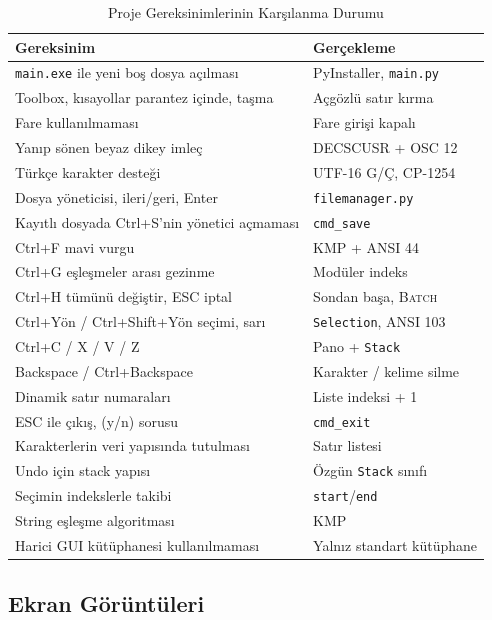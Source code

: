 \documentclass[conference,a4paper]{IEEEtran}
\newcommand{\kod}[1]{\texttt{#1}}
\begin{document}
\begin{table}[t]
\centering
\caption{Proje Gereksinimlerinin Karşılanma Durumu}
\label{tab:gereksinim}
\begin{tabular}{@{}p{4.9cm}p{2.6cm}@{}}
\toprule
\textbf{Gereksinim} & \textbf{Gerçekleme} \\
\midrule
\kod{main.exe} ile yeni boş dosya açılması & PyInstaller, \kod{main.py} \\
Toolbox, kısayollar parantez içinde, taşma & Açgözlü satır kırma \\
Fare kullanılmaması & Fare girişi kapalı \\
Yanıp sönen beyaz dikey imleç & DECSCUSR + OSC 12 \\
Türkçe karakter desteği & UTF-16 G/Ç, CP-1254 \\
Dosya yöneticisi, ileri/geri, Enter & \kod{filemanager.py} \\
Kayıtlı dosyada Ctrl+S'nin yönetici açmaması & \kod{cmd\_save} \\
Ctrl+F mavi vurgu & KMP + ANSI 44 \\
Ctrl+G eşleşmeler arası gezinme & Modüler indeks \\
Ctrl+H tümünü değiştir, ESC iptal & Sondan başa, \textsc{Batch} \\
Ctrl+Yön / Ctrl+Shift+Yön seçimi, sarı & \kod{Selection}, ANSI 103 \\
Ctrl+C / X / V / Z & Pano + \kod{Stack} \\
Backspace / Ctrl+Backspace & Karakter / kelime silme \\
Dinamik satır numaraları & Liste indeksi + 1 \\
ESC ile çıkış, (y/n) sorusu & \kod{cmd\_exit} \\
Karakterlerin veri yapısında tutulması & Satır listesi \\
Undo için stack yapısı & Özgün \kod{Stack} sınıfı \\
Seçimin indekslerle takibi & \kod{start}/\kod{end} \\
String eşleşme algoritması & KMP \\
Harici GUI kütüphanesi kullanılmaması & Yalnız standart kütüphane \\
\bottomrule
\end{tabular}
\end{table}

\subsection{Ekran Görüntüleri}
\end{document}
